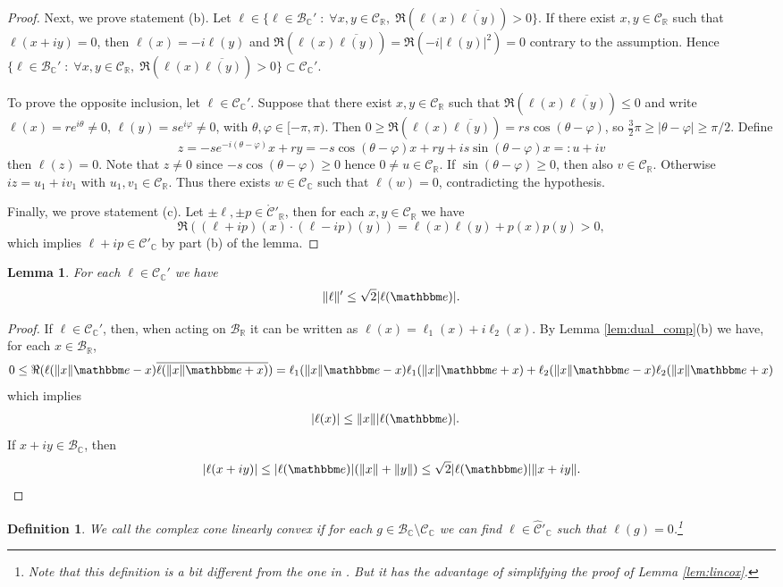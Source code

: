 \documentclass{amsart}
\numberwithin{equation}{section}
\newtheorem{lem}[thm]{Lemma}
\newtheorem{defin}[thm]{Definition}
\newcommand\cB{{\mathcal B}}
\newcommand\cC{{\mathcal C}}
\newcommand\bC{{\mathbb C}}
\newcommand\bR{{\mathbb R}}
\newcommand\vf{\varphi}
\newcommand{\bbe}{\mathbbm e}
\begin{document}
\begin{proof}
Next, we prove statement (b).
Let $\ell\in \{ \ell\in \cB_{\bC}'\;:\; \forall x, y\in \cC_\bR,\; \Re(\ell(x)\overline{\ell(y)})>0 \}$. 
If there exist $x,y\in\cC_\bR$ such that $\ell(x+iy)=0$, then $\ell(x)=-i\ell(y)$ and $\Re(\ell(x)\overline{\ell(y)})=\Re(-i|\ell(y)|^2)=0$ contrary to the assumption.
Hence $\{ \ell\in \cB_{\bC}'\;:\; \forall x, y\in \cC_\bR,\; \Re(\ell(x)\overline{\ell(y)})>0 \}\subset \cC_\bC'$.

To prove the opposite inclusion, let $\ell \in \cC_\bC'$.  Suppose that there exist $x,y\in\cC_\bR$ such that $\Re(\ell(x)\overline{\ell(y)})\leq 0$ and write $\ell(x)=re^{i\theta}\neq 0$, $\ell(y)=s e^{i\vf}\neq 0$, with $\theta,\vf\in [-\pi,\pi)$. Then $0\geq \Re(\ell(x)\overline{\ell(y)})=rs \cos(\theta-\vf)$, so $\frac 32\pi\geq |\theta-\vf|\geq \pi/2$.
Define 
\[
z=-se^{-i(\theta-\vf)}x+r y=-s\cos(\theta-\vf) x+r y+is \sin (\theta-\vf)x=: u+iv 
\]
then $\ell(z)=0$. Note that $z\neq 0$ since $-s\cos(\theta-\vf)\geq 0$ hence $0\neq u\in\cC_\bR$. If $\sin(\theta-\vf)\geq 0$, then also $v\in\cC_\bR$.
Otherwise $i z=u_1+iv_1$ with $u_1,v_1\in\cC_\bR$. Thus there exists $w\in\cC_{\bC}$ such that $\ell(w)=0$, contradicting the hypothesis.

Finally, we prove statement (c).
Let $\pm \ell,\pm p\in\mathring{\cC}'_\bR$, then for each $x,y\in\cC_\bR$ we have
\[
\Re((\ell+ip)(x)\cdot (\ell-ip)(y))=\ell(x)\ell(y)+p(x)p(y)> 0,
\]
which implies $\ell + i p \in \cC'_\bC$ by part (b) of the lemma.
\end{proof}

\begin{lem}\label{lem:upper_dual} For each $\ell\in\cC_{\bC}'$ we have
\[
\|\ell \|' \leq \sqrt 2 |\ell(\bbe)|.
\]
\end{lem}
\begin{proof}
If $\ell\in\cC_{\bC}'$, then, when acting on $\cB_{\bR}$ it can be written as $\ell(x)=\ell_1(x)+i\ell_2(x)$.
By Lemma \ref{lem:dual_comp}(b) we have, for each $x\in\cB_{\bR}$,
\[
0\leq \Re(\ell(\|x\|\bbe-x)\overline{\ell(\|x\|\bbe+x)})=\ell_1(\|x\|\bbe-x)\ell_1(\|x\|\bbe+x)+\ell_2(\|x\|\bbe-x)\ell_2(\|x\|\bbe+x)
\]
which implies
\[
\begin{split}
|\ell(x)|&\leq \|x\| |\ell(\bbe)|.
\end{split}
\]
If $x+iy\in\cB_{\bC}$, then
\[
|\ell(x+iy)|\leq |\ell(\bbe)|(\|x\|+\|y\|)\leq \sqrt 2 |\ell(\bbe)|\|x+iy\|.
\]
\end{proof}


\begin{defin}\label{def:convex}
We call the complex cone {\em linearly convex} if for each $g\in\cB_\bC\setminus \cC_\bC$
we can find $\ell\in \hat\cC'_\bC$ such that $\ell(g)=0$.\footnote{ Note that this definition is a bit different from the one in \cite[Section 3]{Du11}. But it has the advantage of simplifying the proof of Lemma \ref{lem:lincox}.}
\end{defin}
\end{document}
